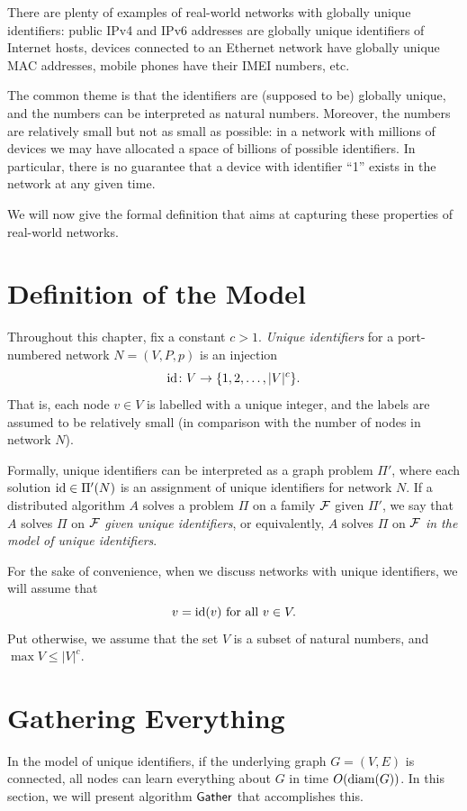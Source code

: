 There are plenty of examples of real-world networks with globally unique identifiers: public IPv4 and IPv6 addresses are globally unique identifiers of Internet hosts, devices connected to an Ethernet network have globally unique MAC addresses, mobile phones have their IMEI numbers, etc.

The common theme is that the identifiers are (supposed to be) globally unique, and the numbers can be interpreted as natural numbers. Moreover, the numbers are relatively small but not as small as possible: in a network with millions of devices we may have allocated a space of billions of possible identifiers. In particular, there is no guarantee that a device with identifier ``1'' exists in the network at any given time.

We will now give the formal definition that aims at capturing these properties of real-world networks.


\section{Definition of the \tLOCAL{} Model}\label{sec:unique-id}

Throughout this chapter, fix a constant $c > 1$. \emph{Unique identifiers} for a port-numbered network $N = (V,P,p)$ is an injection
\[
    \operatorname{id} \colon V \to \{1,2, \dotsc, |V|^c\}.
\]
That is, each node $v \in V$ is labelled with a unique integer, and the labels are assumed to be relatively small (in comparison with the number of nodes in network $N$).

Formally, unique identifiers can be interpreted as a graph problem $\Pi'$, where each solution $\operatorname{id} \in \Pi'(N)$ is an assignment of unique identifiers for network $N$. If a distributed algorithm $A$ solves a problem $\Pi$ on a family $\mathcal{F}$ given $\Pi'$, we say that $A$ solves $\Pi$ on $\mathcal{F}$ \emph{given unique identifiers}, or equivalently, $A$ solves $\Pi$ on $\mathcal{F}$ \emph{in the model of unique identifiers}.

For the sake of convenience, when we discuss networks with unique identifiers, we will assume that
\[
    v = \operatorname{id}(v) \text{ for all } v \in V.
\]
Put otherwise, we assume that the set $V$ is a subset of natural numbers, and $\max V \le |V|^c$.


\section{Gathering Everything}\label{sec:gather}

In the model of unique identifiers, if the underlying graph $G = (V,E)$ is connected, all nodes can learn everything about $G$ in time $O(\operatorname{diam}(G))$. In this section, we will present algorithm $\textsf{Gather}$ that accomplishes this.

